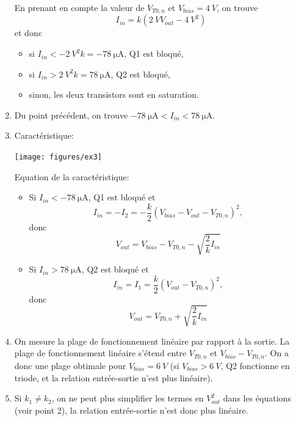 \begin{enumerate}
	En prenant en compte la valeur de $V_{T0,n}$ et $V_{bias} = \SI{4}{V}$, on trouve
	\[I_{in} = k\left(\SI{2}{V} V_{out} - \SI{4}{V^2}\right)\]
	et donc
	\begin{itemize}
		\item si $I_{in} < -\SI{2}{V^2}k = -\SI{78}{\micro\ampere}$, Q1 est bloqué,
		\item si $I_{in} > \SI{2}{V^2}k = \SI{78}{\micro\ampere}$, Q2 est bloqué,
		\item sinon, les deux transistors sont en saturation.
	\end{itemize}

	\item Du point précédent, on trouve $-\SI{78}{\micro\ampere} < I_{in} < \SI{78}{\micro\ampere}$.

	\item Caractéristique:
	\begin{center}
		\texttt{[image: figures/ex3]}
	\end{center}

	Equation de la caractéristique:
	\begin{itemize}
    	\item Si $I_{in} < \SI{-78}{\micro\ampere}$, Q1 est bloqué et
        \[I_{in} = - I_2 = -\frac{k}{2}\left(V_{bias} - V_{out} - V_{T0,n}\right)^2,\]
        donc \[V_{out} = V_{bias} - V_{T0,n} - \sqrt{\frac{2}{k}I_{in}}\]
    	\item Si $I_{in} > \SI{78}{\micro\ampere}$, Q2 est bloqué et
        \[I_{in} = I_1 = \frac{k}{2}\left(V_{out} - V_{T0,n}\right)^2,\]
        donc \[V_{out} = V_{T0,n} + \sqrt{\frac{2}{k}I_{in}}\]
	\end{itemize}
	
	\item On mesure la plage de fonctionnement linéaire par rapport à la sortie. La plage de
	fonctionnement linéaire s'étend entre $V_{T0,n}$ et $V_{bias} - V_{T0,n}$. On a donc une plage
	obtimale pour $V_{bias} = \SI{6}{V}$ (si $V_{bias} > \SI{6}{V}$, Q2 fonctionne en triode, et la
	relation entrée-sortie n'est plus linéaire).

	\item Si $k_1 \neq k_2$, on ne peut plus simplifier les termes en $V_{out}^2$ dans les équations
	(voir point 2), la relation entrée-sortie n'est donc plus linéaire.
\end{enumerate}


